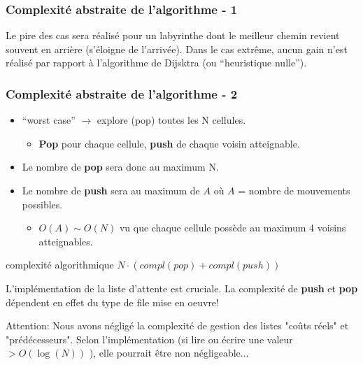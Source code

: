 \documentclass[]{beamer}
\begin{document}
\begin{frame}
  \frametitle{Complexité abstraite de l'algorithme - 1}
  Le pire des cas sera réalisé pour un labyrinthe dont le meilleur chemin revient
  souvent en arrière (s'éloigne de l'arrivée). Dans le cas extrême, aucun gain n'est
  réalisé par rapport à l'algorithme de Dijsktra (ou ``heuristique nulle'').
  \par\medskip
\end{frame}
\begin{frame}
  \frametitle{Complexité abstraite de l'algorithme - 2}
  \begin{itemize}
  \item ``worst case'' $\rightarrow$ explore (pop) toutes les N cellules. 
   \begin{itemize} 
   \item \textbf {Pop} pour chaque cellule, \textbf {push} de chaque voisin atteignable. 
   \end{itemize}
  \item Le nombre de \textbf {pop} sera donc au maximum N.
  \item Le nombre de \textbf {push}  sera au maximum de $A$ 
  où $A$ = nombre de mouvements possibles.
    \begin{itemize} 
    \item $O({A}) \sim O({N})$ vu que chaque cellule possède au maximum 4 voisins atteignables.
    \end{itemize}
   \end{itemize}
  \begin{block}{complexité algorithmique}
  $N \cdot ( compl(pop) + compl(push) )$
  \end{block}
   L'implémentation de la liste d'attente est cruciale.  La complexité de \textbf {push} et \textbf {pop} dépendent en effet du type de file mise en oeuvre!  
   \par Attention: Nous avons négligé la complexité de gestion des listes "coûts réels" et "prédécesseurs". Selon l'implémentation (si lire ou écrire une valeur $ > O(\log(N))$ ), elle pourrait être non négligeable...
\end{frame}
\end{document}
